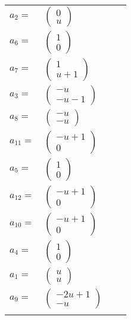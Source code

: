 \documentclass[1p]{elsarticle_modified}
\theoremstyle{definition}
\begin{document}
\begin{tabular}{m{7pt} m{180pt} m{7pt} m{180pt} }
\flushright $a_{2}=$&$\begin{pmatrix}0\\u\end{pmatrix}$ \\
\flushright $a_{6}=$&$\begin{pmatrix}1\\0\end{pmatrix}$ \\
\flushright $a_{7}=$&$\begin{pmatrix}1\\u+1\end{pmatrix}$ \\
\flushright $a_{3}=$&$\begin{pmatrix}- u\\- u-1\end{pmatrix}$ \\
\flushright $a_{8}=$&$\begin{pmatrix}- u\\- u\end{pmatrix}$ \\
\flushright $a_{11}=$&$\begin{pmatrix}- u+1\\0\end{pmatrix}$ \\
\flushright $a_{5}=$&$\begin{pmatrix}1\\0\end{pmatrix}$ \\
\flushright $a_{12}=$&$\begin{pmatrix}- u+1\\0\end{pmatrix}$ \\
\flushright $a_{10}=$&$\begin{pmatrix}- u+1\\0\end{pmatrix}$ \\
\flushright $a_{4}=$&$\begin{pmatrix}1\\0\end{pmatrix}$ \\
\flushright $a_{1}=$&$\begin{pmatrix}u\\u\end{pmatrix}$ \\
\flushright $a_{9}=$&$\begin{pmatrix}-2 u+1\\- u\end{pmatrix}$\\&\end{tabular}
\end{document}
